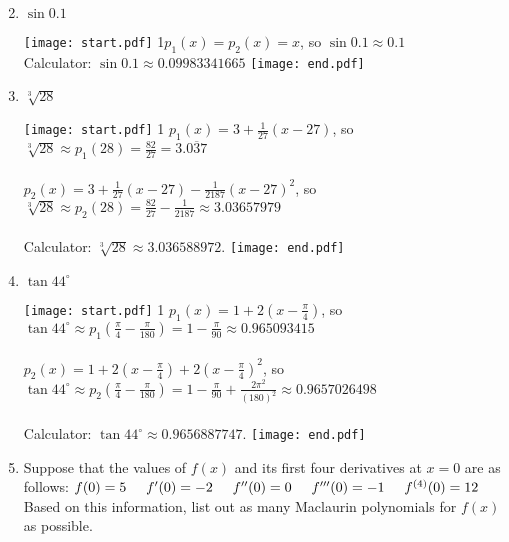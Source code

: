 \documentclass[12pt]{article}
\begin{document}
\begin{enumerate}
\setcounter{enumi}{1}

\item $\sin{0.1}$

\texttt{[image: start.pdf]}
{{{{1\linewidth}{$p_1(x)=p_2(x)=x$, so $\sin{0.1} \approx 0.1$ \\
Calculator: $\sin{0.1} \approx 0.09983341665$ }}}}
\texttt{[image: end.pdf]}


\item $\sqrt[3]{28}$

\texttt{[image: start.pdf]}
{{{1\linewidth}{
$p_1(x)=3+\frac{1}{27}(x-27)$, so $\sqrt[3]{28} \approx p_1(28) = \frac{82}{27} = 3.\overline{037}$ \\ \\
$p_2(x)=3+\frac{1}{27}(x-27)-\frac{1}{2187}(x-27)^2$, so $\sqrt[3]{28} \approx p_2(28) = \frac{82}{27}-\frac{1}{2187} \approx 3.03657979$  \\ \\
Calculator: $\sqrt[3]{28} \approx 3.036588972$. }}}
\texttt{[image: end.pdf]}


\item $\tan{44^\circ}$

\texttt{[image: start.pdf]}
{{{1\linewidth}{
$p_1(x)=1+2\left(x-\frac{\pi}{4}\right)$, so $\tan{44^\circ} \approx p_1\left(\frac{\pi}{4}-\frac{\pi}{180}\right) = 1-\frac{\pi}{90} \approx 0.965093415$ \\ \\
$p_2(x)=1+2\left(x-\frac{\pi}{4}\right)+2\left(x-\frac{\pi}{4}\right)^2$, so \\ 
$\tan{44^\circ} \approx p_2\left(\frac{\pi}{4}-\frac{\pi}{180}\right) = 1-\frac{\pi}{90} + \frac{2\pi^2}{(180)^2} \approx 0.9657026498$   \\ \\
Calculator: $\tan{44^\circ} \approx 0.9656887747$. }}}
\texttt{[image: end.pdf]}


\item Suppose that the values of $f(x)$ and its first four derivatives at $x=0$ are as follows: \newline \newline
$f(0)=5 \hspace{5 mm} f^{\prime}(0)=-2 \hspace{5 mm} f^{\prime\prime}(0)=0 \hspace{5 mm} f^{\prime\prime\prime}(0)=-1 \hspace{5 mm} f^{(4)}(0)=12$ \newline \newline
Based on this information, list out as many Maclaurin polynomials for $f(x)$ as possible.


\end{enumerate}
\end{document}
